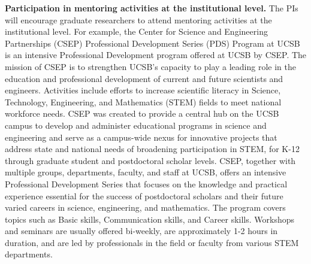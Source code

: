 \textbf{Participation in mentoring activities at the institutional level.} 
The PIs will encourage graduate researchers to attend mentoring activities at the institutional level. 
For example, the Center for Science and Engineering Partnerships (CSEP) Professional Development Series (PDS) Program at
UCSB is an intensive Professional Development program offered at UCSB by CSEP. 
The mission of CSEP is to strengthen UCSB’s capacity to play a leading role in the education and professional development of current and future scientists and engineers. 
Activities include efforts to increase scientific literacy in Science, Technology, Engineering, and Mathematics (STEM) fields to meet national workforce needs. 
CSEP was created to provide a central hub on the UCSB campus to develop and administer educational programs in science and engineering and serve as a campus-wide nexus for innovative projects that address state and national needs of broadening participation in STEM, for K-12 through graduate student and postdoctoral scholar levels. 
CSEP, together with multiple groups, departments, faculty, and staff at UCSB, offers an intensive Professional Development Series that focuses on the knowledge and practical experience essential for the success of postdoctoral
scholars and their future varied careers in science, engineering, and mathematics. 
The program covers topics such as Basic skills, Communication skills, and Career skills. 
Workshops and seminars are usually offered bi-weekly, are approximately 1-2 hours in duration, and are led by professionals in the field or faculty from various STEM departments.